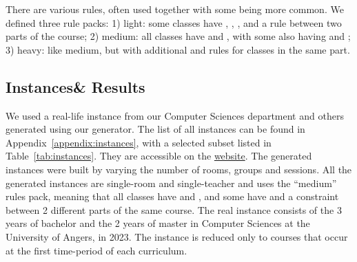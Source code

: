 

There are various rules, often used together with some being more common. We defined three rule packs: 1) light: some classes have \texttt{\SAMEROOMS{}}, \texttt{\SAMETEACHERS{}}, \texttt{\PERIODIC{}}, and a \texttt{\SEQUENCED{}} rule between two parts of the course; 2) medium: all classes have \texttt{\SAMEROOMS{}} and \texttt{\SAMETEACHERS{}}, with some also having \texttt{\PERIODIC{}} and \texttt{\SEQUENCED{}}; 3) heavy: like medium, but with additional \texttt{\SAMETEACHERS{}} and \texttt{\SAMESLOT{}} rules for classes in the same part.

\subsection{Instances\& Results}\label{subsec:experiments}

%
We used a real-life instance from our Computer Sciences department and others generated using our generator. 
The list of all instances can be found in Appendix~\ref{appendix:instances}, with a selected subset listed in Table~\ref{tab:instances}.
They are accessible on the \hyperlink{https://ua-usp.github.io/timetabling/instances}{\UTP{} website}\cite{2024_UTP}.
The generated instances were built by varying the number of rooms, groups and sessions.
All the generated instances are single-room and single-teacher
and uses the ``medium'' rules pack, meaning that all classes have \texttt{\SAMEROOMS{}} and \texttt{\SAMETEACHERS{}}, and some have \texttt{\PERIODIC{}} and a \texttt{\SEQUENCED{}} constraint between 2 different parts of the same course.
%
The real instance consists of the 3 years of bachelor and the 2 years of master in Computer Sciences at the University of Angers, in 2023.
The instance is reduced only to courses that occur at the first time-period of each curriculum.

